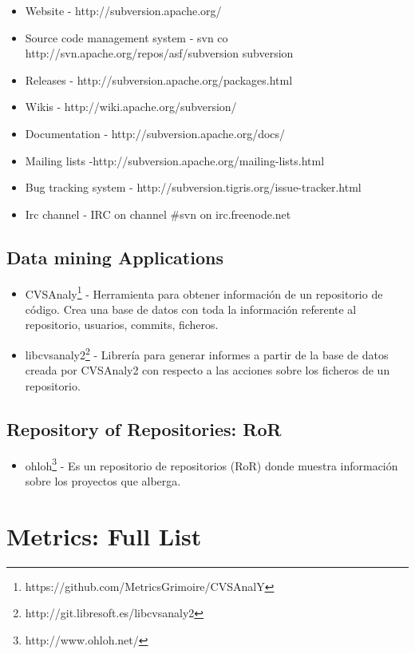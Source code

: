 \documentclass[11pt]{scrartcl}
\begin{document}
\begin{itemize}
    \item Website - http://subversion.apache.org/
    \item Source code management system - svn co http://svn.apache.org/repos/asf/subversion subversion
    \item Releases - http://subversion.apache.org/packages.html
    \item Wikis - http://wiki.apache.org/subversion/
    \item Documentation - http://subversion.apache.org/docs/
    \item Mailing lists -http://subversion.apache.org/mailing-lists.html
    \item Bug tracking system - http://subversion.tigris.org/issue-tracker.html
    \item Irc channel - IRC on channel \#svn on irc.freenode.net
\end{itemize}

\subsection{Data mining Applications}

\begin{itemize}
    \item CVSAnaly\footnote{https://github.com/MetricsGrimoire/CVSAnalY} - Herramienta para obtener informaci\'on de un repositorio de c\'odigo. Crea una base de datos con toda la informaci\'on referente al repositorio, usuarios, commits, ficheros.
    \item libcvsanaly2\footnote{http://git.libresoft.es/libcvsanaly2} - Librer\'ia para generar informes a partir de la base de datos creada por CVSAnaly2 con respecto a las acciones sobre los ficheros de un repositorio.
\end{itemize}

\subsection{Repository of Repositories: RoR}

\begin{itemize}
    \item ohloh\footnote{http://www.ohloh.net/} - Es un repositorio de repositorios (RoR) donde muestra informaci\'on sobre los proyectos que alberga.
\end{itemize}

\section{Metrics: Full List}
\end{document}
